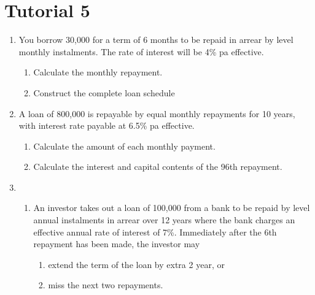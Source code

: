 \documentclass[
]{article}
\theoremstyle{definition}
\theoremstyle{definition}
\theoremstyle{definition}
\theoremstyle{definition}
\theoremstyle{remark}
\begin{document}
\hypertarget{tutorial-5}{%
\section{Tutorial 5}\label{tutorial-5}}

\begin{enumerate}
\def\labelenumi{\arabic{enumi}.}
\item
  You borrow 30,000 for a term of 6 months to be repaid in arrear by
  level monthly instalments. The rate of interest will be 4\% pa
  effective.

  \begin{enumerate}
  \def\labelenumii{\arabic{enumii}.}
  \item
    Calculate the monthly repayment.
  \item
    Construct the complete loan schedule
  \end{enumerate}
\item
  A loan of 800,000 is repayable by equal monthly repayments for 10
  years, with interest rate payable at 6.5\% pa effective.

  \begin{enumerate}
  \def\labelenumii{\arabic{enumii}.}
  \item
    Calculate the amount of each monthly payment.
  \item
    Calculate the interest and capital contents of the 96th
    repayment.
  \end{enumerate}
\item
  \begin{enumerate}
  \def\labelenumii{\arabic{enumii}.}
  \item
    An investor takes out a loan of 100,000 from a bank to be repaid
    by level annual instalments in arrear over 12 years where the
    bank charges an effective annual rate of interest of 7\%.
    Immediately after the 6th repayment has been made, the investor
    may

    \begin{enumerate}
    \def\labelenumiii{\arabic{enumiii}.}
    \item
      extend the term of the loan by extra 2 year, or
    \item
      miss the next two repayments.
    \end{enumerate}


\end{enumerate}
\end{enumerate}
\end{document}
